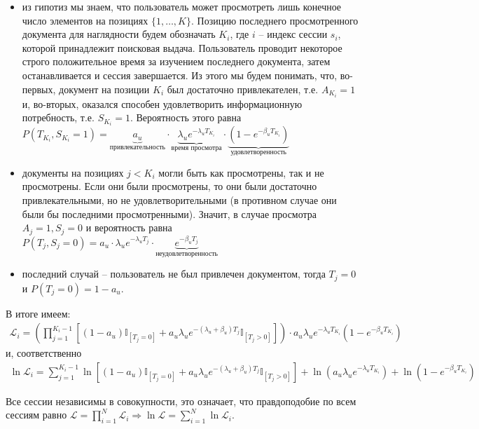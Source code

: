 \documentclass[diploma]{nanolab2015}
\begin{document}
\begin{itemize}
    \item из гипотиз мы знаем, что пользователь может просмотреть лишь конечное число элементов на позициях $\{1, \dots, K\}$. Позицию последнего просмотренного документа для наглядности будем обозначать $K_i$, где $i$ -- индекс сессии $s_i$, которой принадлежит поисковая выдача. Пользователь проводит некоторое строго положительное время за изучением последнего документа, затем останавливается и сессия завершается. Из этого мы будем понимать, что, во-первых, документ на позиции $K_i$ был достаточно привлекателен, т.е. $A_{K_i} = 1$ и, во-вторых, оказался способен удовлетворить информационную потребность, т.е. $S_{K_i} = 1$. Вероятность этого равна $P(T_{K_i}, S_{K_i} = 1) = \underbrace{a_u}_{\text{привлекательность}} \cdot \underbrace{\lambda_u e^{-\lambda_u T_{K_i}}}_{\text{время просмотра}} \cdot \underbrace{(1 - e^{-\beta_u T_{K_i}})}_{\text{удовлетворенность}}$
    \item документы на позициях $j < K_i$ могли быть как просмотрены, так и не просмотрены. Если они были просмотрены, то они были достаточно привлекательными, но не удовлетворительными (в противном случае они были бы последними просмотренными). Значит, в случае просмотра $A_j = 1, S_j = 0$ и вероятность равна $P(T_j, S_j = 0) = a_u \cdot \lambda_u e^{-\lambda_u T_j} \cdot \underbrace{e^{-\beta_u T_j}}_{\text{неудовлетворенность}}$
    \item последний случай -- пользователь не был привлечен документом, тогда $T_j = 0$ и $P(T_j = 0) = 1 - a_u$.
\end{itemize}

В итоге имеем:
\begin{align}
    \mathcal{L}_i = \left( \prod_{j=1}^{K_i-1} \left[(1-a_u)\mathbb{I}_{[T_j=0]} + a_u \lambda_u e^{-(\lambda_u + \beta_u)T_j} \mathbb{I}_{[T_j > 0]} \right] \right) \cdot a_u \lambda_u e^{-\lambda_u T_{K_i}} (1 - e^{-\beta_u T_{K_i}})
\end{align}
и, соответственно
\begin{align}
    \ln\mathcal{L}_i = \sum_{j=1}^{K_i-1}\ln \left[ (1-a_u)\mathbb{I}_{[T_j=0]} + a_u \lambda_u e^{-(\lambda_u + \beta_u)T_j} \mathbb{I}_{[T_j > 0]} \right] + \ln(a_u\lambda_u e^{-\lambda_u T_{K_i}}) + \ln (1 - e^{-\beta_u T_{K_i}}) \label{mle:2}
\end{align}

Все сессии независимы в совокупности, это означает, что правдоподобие по всем сессиям равно $\mathcal{L} = \prod\limits_{i=1}^{N} \mathcal{L}_i \Rightarrow \ln \mathcal{L} = \sum\limits_{i=1}^{N} \ln \mathcal{L}_i$. 
\end{document}
